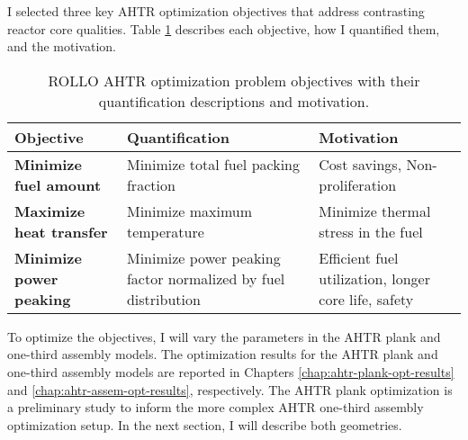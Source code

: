 I selected three key \gls{AHTR} optimization objectives that address contrasting reactor 
core qualities. 
Table \ref{tab:objectives} describes each objective, how I quantified them, and the motivation.
\begin{table}[htbp]
    \centering
    \onehalfspacing
    \caption{\acrfull{ROLLO} \acrfull{AHTR} optimization problem objectives with 
    their quantification descriptions and motivation.}
	\label{tab:objectives}
    \footnotesize
    \begin{tabular}{p{4.5cm}|p{5cm}p{5cm}}
    \hline 
    \textbf{Objective}& \textbf{Quantification}& \textbf{Motivation} \\
    \hline
    \textbf{Minimize fuel amount} & Minimize total fuel packing \newline fraction 
    & Cost savings, Non-proliferation \\ 
    \hline
    \textbf{Maximize heat transfer} & Minimize maximum temperature 
    & Minimize thermal stress in the fuel \\
    \hline
    \textbf{Minimize power peaking} & Minimize power peaking factor normalized by fuel distribution 
    & Efficient fuel utilization, longer core life, safety\\
    \hline
    \end{tabular}
\end{table}

To optimize the objectives, I will vary the parameters in the \gls{AHTR} plank and 
one-third assembly models. 
The optimization results for the \gls{AHTR} plank and one-third assembly models are 
reported in Chapters \ref{chap:ahtr-plank-opt-results} and \ref{chap:ahtr-assem-opt-results}, 
respectively. 
The \gls{AHTR} plank optimization is a preliminary study to inform the more complex 
\gls{AHTR} one-third assembly optimization setup. 
In the next section, I will describe both geometries. 

